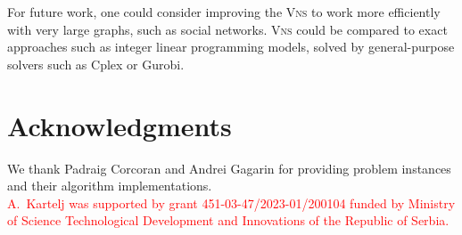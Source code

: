 \documentclass[dvipsnames,format=sigconf]{acmart} %
\begin{document}
 For future work, one could consider improving the \textsc{Vns} to work more efficiently with very large graphs, such as social networks. \textsc{Vns} could be compared to exact approaches such as integer linear programming models, solved by {\color{red} general-purpose solvers such as} Cplex or Gurobi. 
  
\section*{Acknowledgments} 
We thank Padraig Corcoran and Andrei Gagarin for providing problem instances and their algorithm implementations.\\  
\textcolor{red}{A.~Kartelj was supported by grant 451-03-47/2023-01/200104 funded by Ministry of Science Technological Development and Innovations of the Republic of Serbia.}



 
\end{document}
